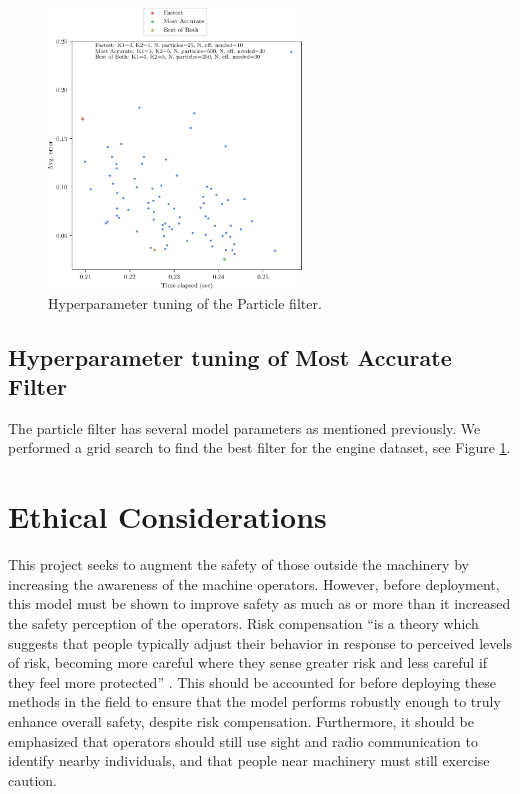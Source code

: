 \documentclass[11pt]{amsart}
\begin{document}
\begin{figure}[htp]
    \centering
    \includegraphics[width=0.6\textwidth]{actual_paper_graphs/gridsearch_particle_filter.pdf}\hfill
    \caption{Hyperparameter tuning of the Particle filter.}
    \label{fig:particle_hyperparam}
\end{figure}

\subsection{Hyperparameter tuning of Most Accurate Filter}

The particle filter has several model parameters as mentioned previously. We performed a grid search
to find the best filter for the engine dataset, see Figure \ref{fig:particle_hyperparam}.









\section{Ethical Considerations}
This project seeks to augment the safety of those outside the machinery by increasing the awareness of the machine operators. However, before deployment, this model must be 
shown to improve safety as much as or more than it increased the safety perception of the operators. Risk compensation “is a theory which suggests that people typically adjust 
their behavior in response to perceived levels of risk, becoming more careful where they sense greater risk and less careful if they feel more protected” \cite{Risk}. This should 
be accounted for before deploying these methods in the field to ensure that the model performs robustly enough to truly enhance overall safety, despite risk compensation. Furthermore, 
it should be emphasized that operators should still use sight and radio communication to identify nearby individuals, and that people near machinery must still exercise caution. 
\end{document}
